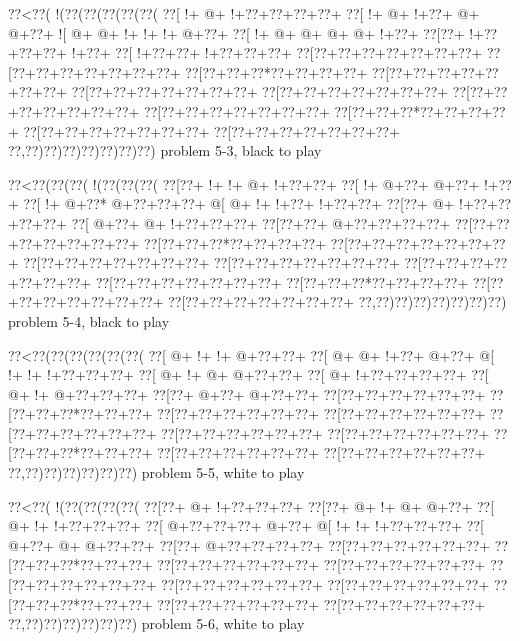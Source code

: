 \vbox{\vbox{\goo
\0??<\0??(\- !(\0??(\0??(\0??(\0??(\0??(
\0??[\- !+\- @+\- !+\0??+\0??+\0??+\0??+
\0??[\- !+\- @+\- !+\0??+\- @+\- @+\0??+
\- ![\- @+\- @+\- !+\- !+\- !+\- @+\0??+
\0??[\- !+\- @+\- @+\- @+\- @+\- !+\0??+
\0??[\0??+\- !+\0??+\0??+\0??+\- !+\0??+
\0??[\- !+\0??+\0??+\- !+\0??+\0??+\0??+
\0??[\0??+\0??+\0??+\0??+\0??+\0??+\0??+
\0??[\0??+\0??+\0??+\0??+\0??+\0??+\0??+
\0??[\0??+\0??+\0??*\0??+\0??+\0??+\0??+
\0??[\0??+\0??+\0??+\0??+\0??+\0??+\0??+
\0??[\0??+\0??+\0??+\0??+\0??+\0??+\0??+
\0??[\0??+\0??+\0??+\0??+\0??+\0??+\0??+
\0??[\0??+\0??+\0??+\0??+\0??+\0??+\0??+
\0??[\0??+\0??+\0??+\0??+\0??+\0??+\0??+
\0??[\0??+\0??+\0??*\0??+\0??+\0??+\0??+
\0??[\0??+\0??+\0??+\0??+\0??+\0??+\0??+
\0??[\0??+\0??+\0??+\0??+\0??+\0??+\0??+
\0??,\0??)\0??)\0??)\0??)\0??)\0??)\0??)
}
\hfil problem 5-3, black to play\hfil\break
}

\vbox{\vbox{\goo
\0??<\0??(\0??(\0??(\- !(\0??(\0??(\0??(
\0??[\0??+\- !+\- !+\- @+\- !+\0??+\0??+
\0??[\- !+\- @+\0??+\- @+\0??+\- !+\0??+
\0??[\- !+\- @+\0??*\- @+\0??+\0??+\0??+
\- @[\- @+\- !+\- !+\0??+\- !+\0??+\0??+
\0??[\0??+\- @+\- !+\0??+\0??+\0??+\0??+
\0??[\- @+\0??+\- @+\- !+\0??+\0??+\0??+
\0??[\0??+\0??+\- @+\0??+\0??+\0??+\0??+
\0??[\0??+\0??+\0??+\0??+\0??+\0??+\0??+
\0??[\0??+\0??+\0??*\0??+\0??+\0??+\0??+
\0??[\0??+\0??+\0??+\0??+\0??+\0??+\0??+
\0??[\0??+\0??+\0??+\0??+\0??+\0??+\0??+
\0??[\0??+\0??+\0??+\0??+\0??+\0??+\0??+
\0??[\0??+\0??+\0??+\0??+\0??+\0??+\0??+
\0??[\0??+\0??+\0??+\0??+\0??+\0??+\0??+
\0??[\0??+\0??+\0??*\0??+\0??+\0??+\0??+
\0??[\0??+\0??+\0??+\0??+\0??+\0??+\0??+
\0??[\0??+\0??+\0??+\0??+\0??+\0??+\0??+
\0??,\0??)\0??)\0??)\0??)\0??)\0??)\0??)
}
\hfil problem 5-4, black to play\hfil\break
}

\vbox{\vbox{\goo
\0??<\0??(\0??(\0??(\0??(\0??(\0??(
\0??[\- @+\- !+\- !+\- @+\0??+\0??+
\0??[\- @+\- @+\- !+\0??+\- @+\0??+
\- @[\- !+\- !+\- !+\0??+\0??+\0??+
\0??[\- @+\- !+\- @+\- @+\0??+\0??+
\0??[\- @+\- !+\0??+\0??+\0??+\0??+
\0??[\- @+\- !+\- @+\0??+\0??+\0??+
\0??[\0??+\- @+\0??+\- @+\0??+\0??+
\0??[\0??+\0??+\0??+\0??+\0??+\0??+
\0??[\0??+\0??+\0??*\0??+\0??+\0??+
\0??[\0??+\0??+\0??+\0??+\0??+\0??+
\0??[\0??+\0??+\0??+\0??+\0??+\0??+
\0??[\0??+\0??+\0??+\0??+\0??+\0??+
\0??[\0??+\0??+\0??+\0??+\0??+\0??+
\0??[\0??+\0??+\0??+\0??+\0??+\0??+
\0??[\0??+\0??+\0??*\0??+\0??+\0??+
\0??[\0??+\0??+\0??+\0??+\0??+\0??+
\0??[\0??+\0??+\0??+\0??+\0??+\0??+
\0??,\0??)\0??)\0??)\0??)\0??)\0??)
}
\hfil problem 5-5, white to play\hfil\break
}

\vbox{\vbox{\goo
\0??<\0??(\- !(\0??(\0??(\0??(\0??(
\0??[\0??+\- @+\- !+\0??+\0??+\0??+
\0??[\0??+\- @+\- !+\- @+\- @+\0??+
\0??[\- @+\- !+\- !+\0??+\0??+\0??+
\0??[\- @+\0??+\0??+\0??+\- @+\0??+
\- @[\- !+\- !+\- !+\0??+\0??+\0??+
\0??[\- @+\0??+\- @+\- @+\0??+\0??+
\0??[\0??+\- @+\0??+\0??+\0??+\0??+
\0??[\0??+\0??+\0??+\0??+\0??+\0??+
\0??[\0??+\0??+\0??*\0??+\0??+\0??+
\0??[\0??+\0??+\0??+\0??+\0??+\0??+
\0??[\0??+\0??+\0??+\0??+\0??+\0??+
\0??[\0??+\0??+\0??+\0??+\0??+\0??+
\0??[\0??+\0??+\0??+\0??+\0??+\0??+
\0??[\0??+\0??+\0??+\0??+\0??+\0??+
\0??[\0??+\0??+\0??*\0??+\0??+\0??+
\0??[\0??+\0??+\0??+\0??+\0??+\0??+
\0??[\0??+\0??+\0??+\0??+\0??+\0??+
\0??,\0??)\0??)\0??)\0??)\0??)\0??)
}
\hfil problem 5-6, white to play\hfil\break
}

